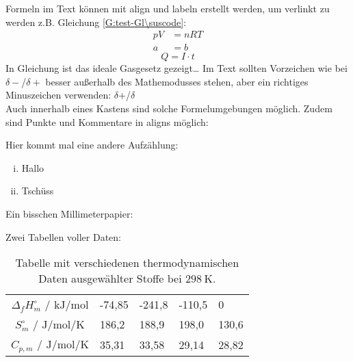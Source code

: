 \documentclass[./main.tex]{subfiles}
\begin{document}
Formeln im Text k\"onnen mit align und labeln erstellt werden, um verlinkt zu werden z.B. Gleichung \ref{G:test-Gl\suscode}:
\begin{align}
    pV &= nRT \label{G:test-Gl\suscode}\\
    a &= b
\end{align}
\begin{equation*}
    Q = I \cdot t
\end{equation*}
In Gleichung ist das ideale Gasgesetz gezeigt\ldots 
Im Text sollten Vorzeichen wie bei $\delta-$/$\delta+$ besser au\ss{}erhalb des Mathemodusses stehen, aber ein richtiges Minuszeichen verwenden: $\delta$+/$\delta$\textminus{}\\
Auch innerhalb eines Kastens sind solche Formelumgebungen m\"oglich. Zudem sind Punkte und Kommentare in aligns m\"oglich:\par
{}
Hier kommt mal eine andere Aufz\"ahlung:
\begin{enumerate}[(i)]
    \item Hallo
    \item Tsch\"uss
\end{enumerate}

Ein bisschen Millimeterpapier:\\


Zwei Tabellen voller Daten:
\begin{table}[H]
    \caption{Tabelle mit verschiedenen thermodynamischen Daten ausgew\"ahlter Stoffe bei $\SI{298}{\kelvin}$.}
    \label{tab: 2025-10-3_therm. Daten\suscode}
    \centering
    \begin{tabular}{|c|C{1.5cm}|C{1.5cm}|C{1.5cm}|C{1.5cm}|}
    \hline
        &  &  &  & \\\hline
        $\Delta_fH^{\circ}_m$ / $\si{\kilo\joule\per\mole}$ & -74,85 & -241,8 & -110,5 & 0\\\hline
        $S^{\circ}_m$ / $\si{\joule\per\mole\per\kelvin}$ & 186,2 & 188,9 & 198,0 & 130,6\\\hline
        $C_{p, m}$ / $\si{\joule\per\mole\per\kelvin}$ & 35,31 & 33,58 & 29,14 & 28,82\\\hline
    \end{tabular}
\end{table}
\end{document}

